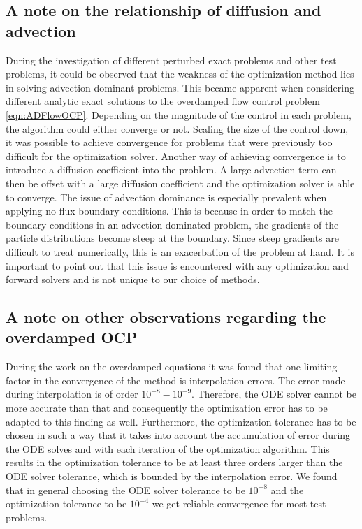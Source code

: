 \documentclass[11pt, a4paper]{article}
\theoremstyle{definition}
\begin{document}
\subsection{A note on the relationship of diffusion and advection}
During the investigation of different perturbed exact problems and other test problems, it could be observed that the weakness of the optimization method lies in solving advection dominant problems. 
This became apparent when considering different analytic exact solutions to the overdamped flow control problem \eqref{eqn:ADFlowOCP}. Depending on the magnitude of the control in each problem, the algorithm could either converge or not. Scaling the size of the control down, it was possible to achieve convergence for problems that were previously too difficult for the optimization solver. Another way of achieving convergence is to introduce a diffusion coefficient into the problem. A large advection term can then be offset with a large diffusion coefficient and the optimization solver is able to converge.
The issue of advection dominance is especially prevalent when applying no-flux boundary conditions. This is because in order to match the boundary conditions in an advection dominated problem, the gradients of the particle distributions become steep at the boundary. Since steep gradients are difficult to treat numerically, this is an exacerbation of the problem at hand.
It is important to point out that this issue is encountered with any optimization and forward solvers and is not unique to our choice of methods. 

\subsection{A note on other observations regarding the overdamped OCP}
During the work on the overdamped equations it was found that one limiting factor in the convergence of the method is interpolation errors. The error made during interpolation is of order $10^{-8} - 10^{-9}$. Therefore, the ODE solver cannot be more accurate than that and consequently the optimization error has to be adapted to this finding as well.
Furthermore, the optimization tolerance has to be chosen in such a way that it takes into account the accumulation of error during the ODE solves and with each iteration of the optimization algorithm. This results in the optimization tolerance to be at least three orders larger than the ODE solver tolerance, which is bounded by the interpolation error. We found that in general choosing the ODE solver tolerance to be $10^{-8}$ and the optimization tolerance to be $10^{-4}$ we get reliable convergence for most test problems.
\end{document}
